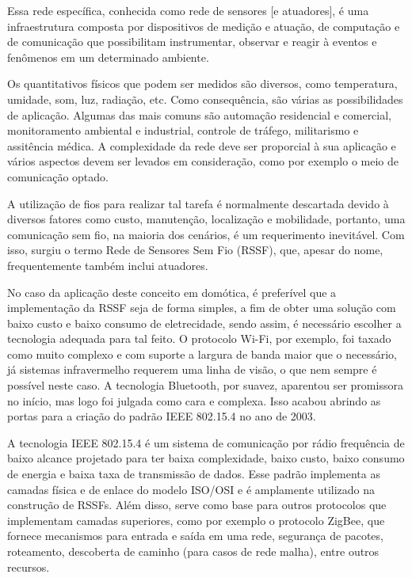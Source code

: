 \documentclass[
    12pt,               %
    a4paper,            %
    english,            %
    brazil,             %
    ]{article}
\begin{document}
Essa rede específica, conhecida como rede de sensores [e atuadores], é uma infraestrutura composta por dispositivos de medição e
atuação, de computação e de comunicação que possibilitam instrumentar, observar e reagir à eventos e fenômenos em um determinado
ambiente. \cite{sohraby_minoli_znati2007}

Os quantitativos físicos que podem ser medidos são diversos, como temperatura, umidade, som, luz, radiação, etc. Como
consequência, são várias as possibilidades de aplicação. Algumas das mais comuns são automação residencial e comercial,
monitoramento ambiental e industrial, controle de tráfego, militarismo e assitência médica. A complexidade da rede deve ser
proporcial à sua aplicação e vários aspectos devem ser levados em consideração, como por exemplo o meio de comunicação optado.
\cite{kuorilehto2007}

A utilização de fios para realizar tal tarefa é normalmente descartada devido à diversos fatores como custo, manutenção,
localização e mobilidade, portanto, uma comunicação sem fio, na maioria dos cenários, é um requerimento inevitável. Com isso,
surgiu o termo Rede de Sensores Sem Fio (RSSF), que, apesar do nome, frequentemente também inclui atuadores.
\cite{karl_willig2005}

No caso da aplicação deste conceito em domótica, é preferível que a implementação da RSSF seja de forma simples, a fim de obter
uma solução com baixo custo e baixo consumo de eletrecidade, sendo assim, é necessário escolher a tecnologia adequada para tal
feito. O protocolo Wi-Fi, por exemplo, foi taxado como muito complexo e com suporte a largura de banda maior que o necessário, já
sistemas infravermelho requerem uma linha de visão, o que nem sempre é possível neste caso. A tecnologia Bluetooth, por suavez,
aparentou ser promissora no início, mas logo foi julgada como cara e complexa. Isso acabou abrindo as portas para a criação do
padrão IEEE 802.15.4 no ano de 2003.  \cite{sohraby_minoli_znati2007}

A tecnologia IEEE 802.15.4 é um sistema de comunicação por rádio frequência de baixo alcance projetado para ter baixa
complexidade, baixo custo, baixo consumo de energia e baixa taxa de transmissão de dados. Esse padrão implementa as camadas física
e de enlace do modelo ISO/OSI e é amplamente utilizado na construção de RSSFs. Além disso, serve como base para outros protocolos
que implementam camadas superiores, como por exemplo o protocolo ZigBee, que fornece mecanismos para entrada e saída em uma rede,
segurança de pacotes, roteamento, descoberta de caminho (para casos de rede malha), entre outros recursos. \cite{buratti2011}
\end{document}
